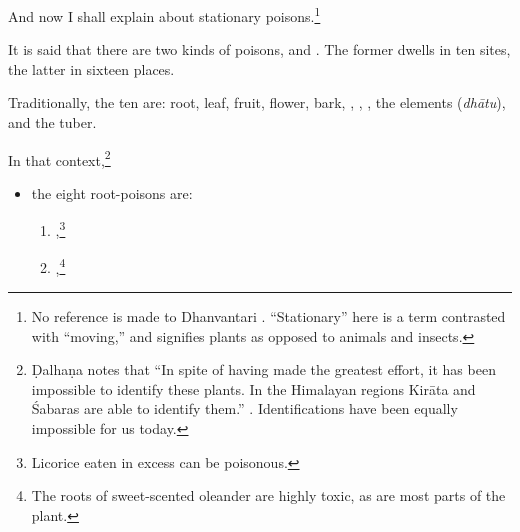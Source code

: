 \begin{translation}
    
    \item[1]
    And now I shall explain  about stationary 
    poisons.\footnote{No reference is made to Dhanvantari 
    \citep[see][]{birc-2021}. “Stationary” here is a term contrasted with “moving,” 
    and signifies plants as opposed to animals and insects.}
  
    \item[3]
    \noindent It is said that there are two kinds of poisons,
     and . The former
    dwells in ten sites, the latter in sixteen places.
   
    \item[4]
    Traditionally, the ten are: root, leaf, fruit, flower, bark,
    , , , the
    elements (\emph{dhātu}), and the tuber.

    \item[5]
    
    In that context,\label{poisonousplants}\footnote{Ḍalhaṇa notes that ``In 
    spite 
    of having made the greatest effort, it has been impossible to identify these 
    plants. In the Himalayan regions Kirāta and Śabaras are able to identify them.''  
    \citep[564]{susruta}.  Identifications have been equally impossible for us 
    today.} 
    \begin{itemize}
        \item
        the eight root-poisons are:
        \begin{enumerate}
        \item {},\footnote{Licorice eaten in excess can be poisonous.}
       
        \item {},\footnote{The roots of sweet-scented oleander 
        are highly toxic, as are most parts of the plant.}
    

\end{enumerate}
\end{itemize}
\end{translation}
